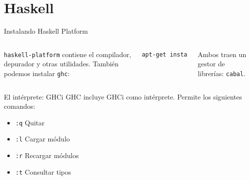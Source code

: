 \section{Haskell}

\begin{frame}[fragile]{Instalando Haskell Platform}

 \begin{columns}
  \texttt{haskell-platform} contiene el compilador, depurador y otras utilidades.
  También podemos instalar \texttt{ghc}:
  \espacio
  \begin{lstlisting}[language=bash]
apt-get install haskell-platform
  \end{lstlisting}
  \espacio
  Ambos traen un gestor de librerías: \texttt{cabal}.
  \haskelllogo[rounded corners=2pt]
 \end{columns}
  
\end{frame}


\begin{frame}{El intérprete: GHCi}
  GHC incluye GHCi como intérprete. Permite los siguientes comandos:
  \espacio
  \begin{itemize}
    \item \texttt{:q} \qquad  Quitar
    \item \texttt{:l} \qquad  Cargar módulo
    \item \texttt{:r} \qquad  Recargar módulos
    \item \texttt{:t} \qquad  Consultar tipos
  \end{itemize}

\end{frame}


